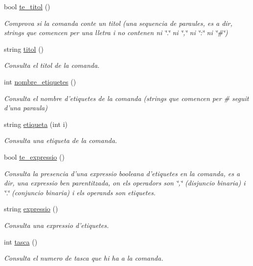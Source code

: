 \begin{DoxyCompactItemize}
bool \hyperlink{class_comanda_a5452f5a877d58627cd2bd871cf31b074}{te\-\_\-titol} ()
\begin{DoxyCompactList}\small\item\em Comprova si la comanda conte un titol (una sequencia de paraules, es a dir, strings que comencen per una lletra i no contenen ni \char`\"{}.\char`\"{} ni \char`\"{},\char`\"{} ni \char`\"{}\-:\char`\"{} ni \char`\"{}\#\char`\"{}) \end{DoxyCompactList}\item 
string \hyperlink{class_comanda_ad1cefdda3db389d9ab536a59e2ee907d}{titol} ()
\begin{DoxyCompactList}\small\item\em Consulta el titol de la comanda. \end{DoxyCompactList}\item 
int \hyperlink{class_comanda_a4280b6ae2d435d9c21bbed364cb1db3d}{nombre\-\_\-etiquetes} ()
\begin{DoxyCompactList}\small\item\em Consulta el nombre d'etiquetes de la comanda (strings que comencen per \# seguit d'una paraula) \end{DoxyCompactList}\item 
string \hyperlink{class_comanda_ac80e9a80d16c6bac9a134e431bca1ed0}{etiqueta} (int i)
\begin{DoxyCompactList}\small\item\em Consulta una etiqueta de la comanda. \end{DoxyCompactList}\item 
bool \hyperlink{class_comanda_a81d17f4233e33f3baac7633546c066f0}{te\-\_\-expressio} ()
\begin{DoxyCompactList}\small\item\em Consulta la presencia d'una expressio booleana d'etiquetes en la comanda, es a dir, una expressio ben parentitzada, on els operadors son \char`\"{},\char`\"{} (disjuncio binaria) i \char`\"{}.\char`\"{} (conjuncio binaria) i els operands son etiquetes. \end{DoxyCompactList}\item 
string \hyperlink{class_comanda_aa3191131592fbf58d20bed1052c31cd1}{expressio} ()
\begin{DoxyCompactList}\small\item\em Consulta una expressio d'etiquetes. \end{DoxyCompactList}\item 
int \hyperlink{class_comanda_a67591051e9c5977c324ad8f8c3ac16e3}{tasca} ()
\begin{DoxyCompactList}\small\item\em Consulta el numero de tasca que hi ha a la comanda. \end{DoxyCompactList}\end{DoxyCompactItemize}



